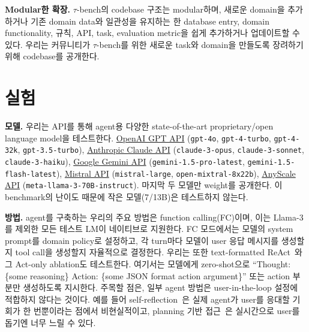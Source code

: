 \documentclass{article}
\newcommand{\benchmark}{$\tau$-bench}
\begin{document}
\textbf{Modular한 확장.} \benchmark{}의 codebase 구조는 modular하며, 새로운 domain을 추가하거나 기존 domain data와 일관성을 유지하는 한 database entry, domain functionality, 규칙, API, task, evaluation metric을 쉽게 추가하거나 업데이트할 수 있다. 우리는 커뮤니티가 \benchmark{}를 위한 새로운 task와 domain을 만들도록 장려하기 위해 codebase를 공개한다.





\section{실험} \label{sec:experiments}




\textbf{모델.} 우리는 API를 통해 agent용 다양한 state-of-the-art proprietary/open language model을 테스트한다.
    \href{https://openai.com/api/}{OpenAI GPT API} (\texttt{gpt-4o}, \texttt{gpt-4-turbo}, \texttt{gpt-4-32k}, \texttt{gpt-3.5-turbo}),
    \href{https://www.anthropic.com/api}{Anthropic Claude API} (\texttt{claude-3-opus}, \texttt{claude-3-sonnet}, \texttt{claude-3-haiku}), %
    \href{https://ai.google.dev/gemini-api/}{Google Gemini API} (\texttt{gemini-1.5-pro-latest}, \texttt{gemini-1.5-flash-latest}), %
    \href{https://docs.mistral.ai/api/}{Mistral API} (\texttt{mistral-large}, \texttt{open-mixtral-8x22b}),
    \href{https://console.anyscale.com}{AnyScale API} (\texttt{meta-llama-3-70B-instruct}).
마지막 두 모델만 weight를 공개한다. 이 benchmark의 난이도 때문에 작은 모델(7/13B)은 테스트하지 않는다.

\textbf{방법.} agent를 구축하는 우리의 주요 방법은 function calling(FC)이며, 이는 Llama-3를 제외한 모든 테스트 LM이 네이티브로 지원한다. FC 모드에서는 모델의 system prompt를 domain policy로 설정하고, 각 turn마다 모델이 user 응답 메시지를 생성할지 tool call을 생성할지 자율적으로 결정한다. 우리는 또한 text-formatted ReAct~\citep{yao2023react}와 그 Act-only ablation도 테스트한다. 여기서는 모델에게 zero-shot으로 ``Thought: \{some reasoning\} Action: \{some JSON format action argument\}'' 또는 action 부분만 생성하도록 지시한다. 주목할 점은, 일부 agent 방법은 user-in-the-loop 설정에 적합하지 않다는 것이다. 예를 들어 self-reflection~\cite{shinn2023reflexion}은 실제 agent가 user를 응대할 기회가 한 번뿐이라는 점에서 비현실적이고, planning 기반 접근~\cite{yao2023tree}은 실시간으로 user를 돕기엔 너무 느릴 수 있다.
\end{document}
